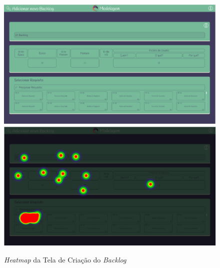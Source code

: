 \begin{figure}[]
  \begin{center}
      \caption{{\textit{Heatmap} da Tela de Criação do \textit{Backlog}}}
      \label{fig:backlog_hm_2}
      \includegraphics[scale=0.45]{figuras/UsabilityHub/backlog/3.png}
      \includegraphics[scale=0.45]{figuras/UsabilityHub/backlog/4.png}
  \end{center}
\end{figure}

